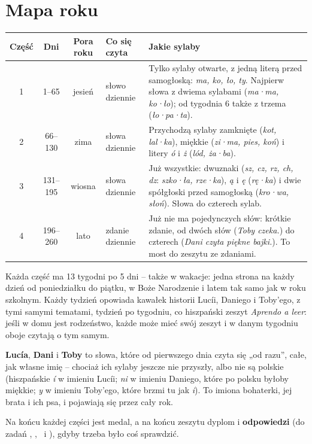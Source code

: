 \section*{Mapa roku}

\begin{center}
\renewcommand{\arraystretch}{1.4}
\begin{tabularx}{\linewidth}{@{}c c c >{\raggedright\arraybackslash}p{27mm} >{\raggedright\arraybackslash}X@{}}
\toprule
\textbf{Część} & \textbf{Dni} & \textbf{Pora roku} & \textbf{Co się czyta} & \textbf{Jakie sylaby} \\
\midrule
1 & 1--65    & jesień & 1 słowo dziennie  & Tylko sylaby otwarte, z jedną literą przed samogłoską: \emph{ma,
ko, ło, ty}. Najpierw słowa z dwiema sylabami (\emph{ma·ma, ko·ło});
od tygodnia 6 także z trzema (\emph{ło·pa·ta}). \\
2 & 66--130  & zima   & 2 słowa dziennie  & Przychodzą sylaby zamknięte (\emph{kot, lal·ka}), miękkie
(\emph{zi·ma, pies, koń}) i litery \emph{ó} i \emph{ż} (\emph{lód,
ża·ba}). \\
3 & 131--195 & wiosna & 3 słowa dziennie  & Już wszystkie: dwuznaki (\emph{sz, cz, rz, ch, dz}:
\emph{szko·ła, rze·ka}), \emph{ą} i \emph{ę} (\emph{rę·ka}) i dwie
spółgłoski przed samogłoską (\emph{kro·wa, słoń}). Słowa do czterech
sylab. \\
4 & 196--260 & lato   & 1 zdanie dziennie & Już nie ma pojedynczych słów: krótkie zdanie, od dwóch słów
(\emph{Toby czeka.}) do czterech (\emph{Dani czyta piękne bajki.}). To
most do zeszytu ze zdaniami. \\
\bottomrule
\end{tabularx}
\end{center}

\vspace{6mm}
Każda część ma 13 tygodni po 5 dni -- także w wakacje: jedna strona na
każdy dzień od poniedziałku do piątku, w Boże Narodzenie i latem tak
samo jak w roku szkolnym. Każdy tydzień opowiada kawałek historii
Lucíi, Daniego i Toby'ego, z tymi samymi tematami, tydzień po
tygodniu, co hiszpański zeszyt \emph{Aprendo a leer}: jeśli w domu jest
rodzeństwo, każde może mieć swój zeszyt i w danym tygodniu oboje czytają
o tym samym.

\vspace{4mm}
\textbf{Lucía}, \textbf{Dani} i \textbf{Toby} to słowa, które od
pierwszego dnia czyta się „od razu”, całe, jak własne imię -- chociaż
ich sylaby jeszcze nie przyszły, albo nie są polskie (hiszpańskie \emph{í}
w imieniu Lucíi; \emph{ni} w imieniu Daniego, które po polsku byłoby
miękkie; \emph{y} w imieniu Toby'ego, które brzmi tu jak \emph{i}). To imiona bohaterki, jej brata i ich psa, i pojawiają
się przez cały rok.

\vspace{4mm}
Na końcu każdej części jest medal, a na końcu zeszytu dyplom i
\textbf{odpowiedzi} (do zadań \lblAdivina, \lblUne, \lblEncuentra\ i
\lblSiNo), gdyby trzeba było coś sprawdzić.
\newpage
